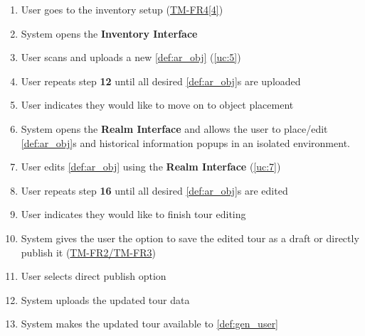 \documentclass{article}
\begin{document}
\begin{enumerate}[label=\textbf{UC\arabic*}]
\begin{enumerate}[label=\textbf{\arabic*.}]
            \item User goes to the inventory setup (\hyperref[ssub:tour_management]{TM-FR4[4]})
            \item System opens the \textbf{Inventory Interface}
            \item User scans and uploads a new \ref{def:ar_obj} (\ref{uc:5})
            \item User repeats step \textbf{12} until all desired \ref{def:ar_obj}s are uploaded
            \item User indicates they would like to move on to object placement
            \item System opens the \textbf{Realm Interface} and allows the user to place/edit \ref{def:ar_obj}s and historical information popups in an isolated environment.
            \item User edits \ref{def:ar_obj} using the \textbf{Realm Interface} (\ref{uc:7})
            \item User repeats step \textbf{16} until all desired \ref{def:ar_obj}s are edited
            \item User indicates they would like to finish tour editing
            \item System gives the user the option to save the edited tour as a draft or directly publish it (\hyperref[ssub:tour_management]{TM-FR2/TM-FR3})
            \item User selects direct publish option
            \item System uploads the updated tour data
            \item System makes the updated tour available to \ref{def:gen_user}
        \end{enumerate}
    

\end{enumerate}
\end{document}
